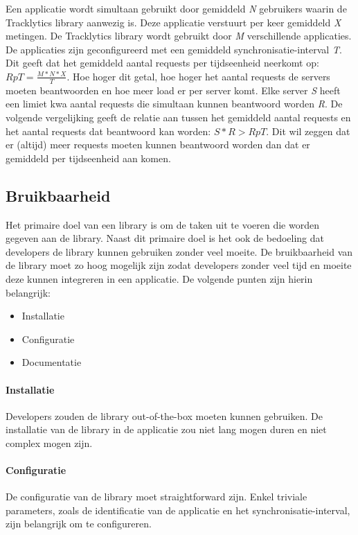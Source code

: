 \noindent Een applicatie wordt simultaan gebruikt door gemiddeld \textit{N} gebruikers waarin de Tracklytics library aanwezig is. Deze applicatie verstuurt per keer gemiddeld \textit{X} metingen. De Tracklytics library wordt gebruikt door \textit{M} verschillende applicaties. De applicaties zijn geconfigureerd met een gemiddeld synchronisatie-interval \textit{T}. Dit geeft dat het gemiddeld aantal requests per tijdseenheid neerkomt op: $RpT=\frac{M*N*X}{T}$. Hoe hoger dit getal, hoe hoger het aantal requests de servers moeten beantwoorden en hoe meer load er per server komt. Elke server \textit{S} heeft een limiet kwa aantal requests die simultaan kunnen beantwoord worden \textit{R}. De volgende vergelijking geeft de relatie aan tussen het gemiddeld aantal requests en het aantal requests dat beantwoord kan worden: $S*R > RpT$. Dit wil zeggen dat er (altijd) meer requests moeten kunnen beantwoord worden dan dat er gemiddeld per tijdseenheid aan komen.\\



\subsection{Bruikbaarheid}
Het primaire doel van een library is om de taken uit te voeren die worden gegeven aan de library. Naast dit primaire doel is het ook de bedoeling dat developers de library kunnen gebruiken zonder veel moeite. De bruikbaarheid van de library moet zo hoog mogelijk zijn zodat developers zonder veel tijd en moeite deze kunnen integreren in een applicatie. De volgende punten zijn hierin belangrijk: 
\begin{itemize}
\item Installatie
\item Configuratie
\item Documentatie
\end{itemize}

\paragraph{Installatie} Developers zouden de library out-of-the-box moeten kunnen gebruiken. De installatie van de library in de applicatie zou niet lang mogen duren en niet complex mogen zijn. \\

\paragraph{Configuratie} De configuratie van de library moet straightforward zijn. Enkel triviale parameters, zoals de identificatie van de applicatie en het synchronisatie-interval, zijn belangrijk om te configureren. \\

